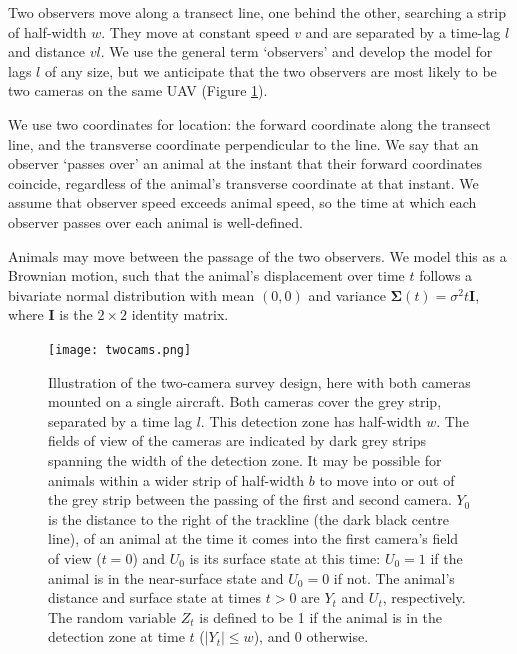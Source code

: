 \documentclass[useAMS, usenatbib, referee]{biom}\usepackage[]{graphicx}\usepackage[]{color}
\begin{document}

Two observers move along a transect line, one behind the other, searching a strip of half-width $w$. They move at constant speed $v$ and are separated by a time-lag $l$ and distance $vl$. We use the general term `observers' and develop the model for lags $l$ of any size, but we anticipate that the two observers are most likely to be two cameras on the same UAV (Figure \ref{fig:branching_updated}).

We use two coordinates for location: the forward coordinate along the transect line, and the transverse coordinate perpendicular to the line. We say that an observer `passes over' an animal at the instant that their forward coordinates coincide, regardless of the animal's transverse coordinate at that instant. We assume that observer speed exceeds animal speed, so the time at which each observer passes over each animal is well-defined.

Animals may move between the passage of the two observers. We model this as a Brownian motion, such that the animal's displacement over time $t$ follows a bivariate normal distribution with mean $(0,0)$ and variance $\bm{\Sigma}(t)=\sigma^2t\bm{I}$, where $\bm{I}$ is the $2\times 2$ identity matrix.

\begin{figure}
\texttt{[image: twocams.png]}
\centering
\caption{Illustration of the two-camera survey design, here with both cameras mounted on a single aircraft. Both cameras cover the grey strip, separated by a time lag $l$. This detection zone has half-width $w$. The fields of view of the cameras are indicated by dark grey strips spanning the width of the detection zone. It may be possible for animals within a wider strip of half-width $b$ to move into or out of the grey strip between the passing of the first and second camera. $Y_0$ is the distance to the right of the trackline (the dark black centre line), of an animal at the time it comes into the first camera's field of view ($t=0$) and $U_0$ is its surface state at this time: $U_0=1$ if the animal is in the near-surface state and $U_0=0$ if not. The animal's distance and surface state at times $t>0$ are $Y_t$ and $U_t$, respectively. The random variable $Z_t$ is defined to be 1 if the animal is in the detection zone at time $t$ ($|Y_t|\leq w$), and 0 otherwise.}
\label{fig:branching_updated}
\end{figure}
\end{document}
